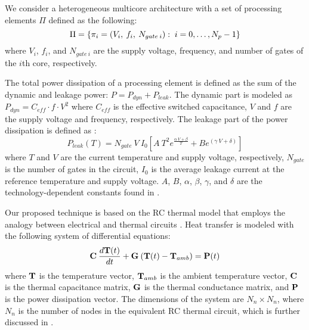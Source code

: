 \label{sec:architecture-model}
We consider a heterogeneous multicore architecture with a set of processing elements $\Pi$ defined as the following:
\[
  \Pi = \{ \pi_i = (V_i, \: f_i, \: N_{gate \: i}): \; i = 0, \dots, N_p - 1 \}
\]
where $V_i$, $f_i$, and $N_{gate \: i}$ are the supply voltage, frequency, and number of gates \cite{liao2005} of the $i$th core, respectively.

\label{sec:power-model}
The total power dissipation of a processing element is defined as the sum of the dynamic and leakage power: $P = P_{dyn} + P_{leak}$. The dynamic part is modeled as $P_{dyn} = C_{eff} \cdot f \cdot V^2$ where $C_{eff}$ is the effective switched capacitance, $V$ and $f$ are the supply voltage and frequency, respectively. The leakage part of the power dissipation is defined as \cite{liao2005}:
\begin{equation} \label{eq:total-power}
  P_{leak}(T) = N_{gate} \: V \: I_0 \left[ A \: T^2 e^{\frac{\alpha \: V + \beta}{T}} + B e^{(\gamma \: V + \delta)} \right]
\end{equation}
where $T$ and $V$ are the current temperature and supply voltage, respectively, $N_{gate}$ is the number of gates in the circuit, $I_0$ is the average leakage current at the reference temperature and supply voltage. $A$, $B$, $\alpha$, $\beta$, $\gamma$, and $\delta$ are the technology-dependent constants found in \cite{liao2005}.

\label{sec:thermal-model}
Our proposed technique is based on the RC thermal model that employs the analogy between electrical and thermal circuits \cite{kreith2000}. Heat transfer is modeled with the following system of differential equations:
\begin{equation} \label{eq:fourier-model}
  \mathbf{C} \: \frac{d\mathbf{T}(t)}{dt} + \mathbf{G} \: (\mathbf{T}(t) - \mathbf{T}_{amb})= \mathbf{P}(t)
\end{equation}
where $\mathbf{T}$ is the temperature vector, $\mathbf{T}_{amb}$ is the ambient temperature vector, $\mathbf{C}$ is the thermal capacitance matrix, $\mathbf{G}$ is the thermal conductance matrix, and $\mathbf{P}$ is the power dissipation vector. The dimensions of the system are $N_n \times N_n$, where $N_n$ is the number of nodes in the equivalent RC thermal circuit, which is further discussed in .
